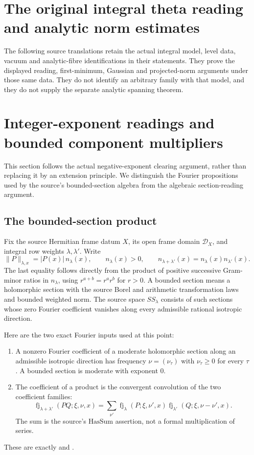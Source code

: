 \section{The original integral theta reading and analytic norm estimates}
\label{sec:faithful-theta-analytic-norms}
The following source translations retain the actual integral model,
level data, vacuum and analytic-fibre identifications in their statements.
They prove the displayed reading, first-minimum, Gaussian and
projected-norm arguments under those same data. They do not identify an
arbitrary family with that model, and they do not supply the separate
analytic spanning theorem.


\section{Integer-exponent readings and bounded component multipliers}
\label{sec:sr-source-integer-reading}
This section follows the actual negative-exponent clearing argument,
rather than replacing it by an extension principle.
We distinguish the Fourier propositions used by the source's
bounded-section algebra from the algebraic section-reading argument.

\subsection{The bounded-section product}
Fix the source Hermitian frame datum \(X\), its open frame domain
\(\mathcal D_X\), and integral row weights \(\lambda,\lambda'\).
Write
\[
 \|P\|_{\lambda,x}=|P(x)|\,n_\lambda(x),\qquad
 n_\lambda(x)>0,\qquad
 n_{\lambda+\lambda'}(x)=n_\lambda(x)n_{\lambda'}(x).
 \tag{IR1}\label{eq:sr-source-reading-nfac}
\]
The last equality follows directly from the product of positive
successive Gram-minor ratios in \(n_\lambda\), using
\(r^{a+b}=r^ar^b\) for \(r>0\).
A bounded section means a holomorphic section with the source
Borel and arithmetic transformation laws and bounded weighted norm.
The source space \(SS_\lambda\) consists of such sections whose
zero Fourier coefficient vanishes along every admissible rational
isotropic direction.

Here are the two exact Fourier inputs used at this point:
\begin{enumerate}
\item A nonzero Fourier coefficient of a moderate holomorphic section
along an admissible isotropic direction has frequency
\(\nu=(\nu_\tau)\) with \(\nu_\tau\ge0\) for every \(\tau\).
A bounded section is moderate with exponent \(0\).
\item The coefficient of a product is the convergent convolution of
the two coefficient families:
\[
 \operatorname{fj}_{\lambda+\lambda'}(PQ;\xi,\nu,x)
 =\sum_{\nu'}\operatorname{fj}_\lambda(P;\xi,\nu',x)
       \operatorname{fj}_{\lambda'}(Q;\xi,\nu-\nu',x).
 \tag{IR2}\label{eq:sr-source-reading-convolution}
\]
The sum is the source's \(\mathrm{HasSum}\) assertion, not a
formal multiplication of series.
\end{enumerate}
These are exactly  and
.

